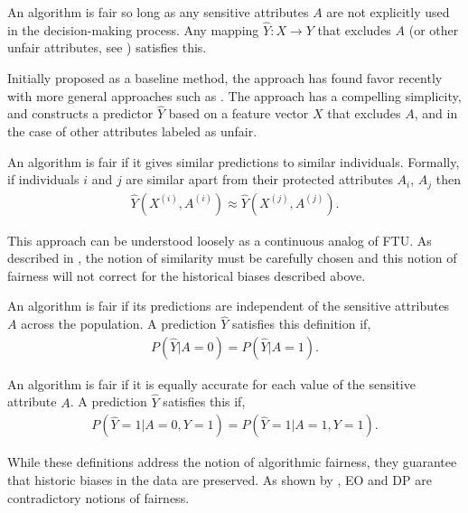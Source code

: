 \begin{define}
  An algorithm is fair so long as any sensitive attributes $A$ are not
  explicitly used in the decision-making process. Any mapping
  $\hat{Y}: X \rightarrow Y$ that excludes $A$ (or other unfair
    attributes, see \citet{grgiccase}) satisfies this.
\end{define}
Initially proposed as a baseline method, the approach has found favor
recently with more general approaches such as \citet{grgiccase}.  The
approach has a compelling simplicity, and constructs a
predictor $\hat Y$ based on a feature vector $X$ that excludes
$A$, and in the case of \citet{grgiccase} other attributes
labeled as unfair.
%
\begin{define}
  An algorithm is fair if it gives similar predictions to similar
  individuals. Formally, if individuals $i$ and $j$ are similar apart
  from their protected attributes $A_i$, $A_j$ then
\begin{align}
  \hat{Y}(X^{(i)}, A^{(i)}) \approx \hat{Y}(X^{(j)}, A^{(j)}).\nonumber
\end{align}
\end{define}
This approach can be understood loosely as a continuous analog of
FTU. As described in \cite{dwork2012fairness}, the
notion of similarity must be carefully chosen and this notion of fairness
will not correct for the historical biases described above.
%
\begin{define}
  An algorithm is fair if its predictions are independent of the
  sensitive attributes $A$ across the population. A prediction
  $\hat{Y}$ satisfies this definition if,
\begin{align}
P(\hat{Y} | A = 0) = P(\hat{Y} | A = 1). \nonumber
\end{align}
\end{define}
%
\begin{define}
An algorithm is fair if it is equally accurate for each value of the sensitive attribute $A$. A prediction $\hat{Y}$ satisfies this if,
\begin{align}
P(\hat{Y}=1 | A=0,Y=1) = P(\hat{Y}=1 | A=1,Y=1). \nonumber
\end{align}
\end{define}
While these definitions address the notion of algorithmic fairness, they guarantee that historic biases in the data are preserved. As shown by \citet{kleinberg2016inherent}, EO and DP are contradictory notions of fairness.

